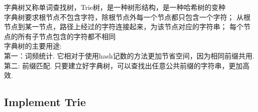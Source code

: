 
\qquad 字典树又称单词查找树，Trie树，是一种树形结构，是一种哈希树的变种\\
\qquad 字典树要求根节点不包含字符，除根节点外每一个节点都只包含一个字符； 从根节点到某一节点，路径上经过的字符连接起来，为该节点对应的字符串； 每个节点的所有子节点包含的字符都不相同\\
\qquad 字典树的主要用途:\\
第一：词频统计. 它相对于使用hash记数的方法更加节省空间，因为相同前缀共用.\\
第二: 前缀匹配. 只要建立好字典树，可以查找出任意公共前缀的字符串，更加高效.
\subsection{Implement Trie}

